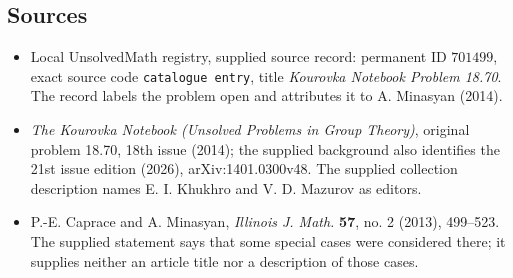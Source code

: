 \documentclass[11pt]{article}
\begin{document}
\subsection{Sources}
\begin{itemize}
\item Local UnsolvedMath registry, supplied source record: permanent ID \(701499\), exact source code \texttt{catalogue entry}, title \emph{Kourovka Notebook Problem 18.70}. The record labels the problem open and attributes it to A. Minasyan (2014).
\item \emph{The Kourovka Notebook (Unsolved Problems in Group Theory)}, original problem 18.70, 18th issue (2014); the supplied background also identifies the 21st issue edition (2026), arXiv:1401.0300v48. The supplied collection description names E. I. Khukhro and V. D. Mazurov as editors.
\item P.-E. Caprace and A. Minasyan, \emph{Illinois J. Math.} \textbf{57}, no. 2 (2013), 499--523. The supplied statement says that some special cases were considered there; it supplies neither an article title nor a description of those cases.
\end{itemize}
\end{document}
